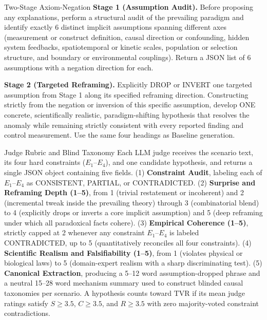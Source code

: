 \documentclass{article}
\begin{document}
\begin{promptbox}{Two-Stage Axiom-Negation}
\textbf{Stage 1 (Assumption Audit).} Before proposing any explanations, perform a structural audit of the prevailing paradigm and identify exactly 6 distinct implicit assumptions spanning different axes (measurement or construct definition, causal direction or confounding, hidden system feedbacks, spatiotemporal or kinetic scales, population or selection structure, and boundary or environmental couplings). Return a JSON list of 6 assumptions with a negation direction for each.

\textbf{Stage 2 (Targeted Reframing).} Explicitly DROP or INVERT one targeted assumption from Stage 1 along its specified reframing direction. Constructing strictly from the negation or inversion of this specific assumption, develop ONE concrete, scientifically realistic, paradigm-shifting hypothesis that resolves the anomaly while remaining strictly consistent with every reported finding and control measurement. Use the same four headings as Baseline generation.
\end{promptbox}

\begin{promptbox}{Judge Rubric and Blind Taxonomy}
Each LLM judge receives the scenario text, its four hard constraints ($E_1$--$E_4$), and one candidate hypothesis, and returns a single JSON object containing five fields.
(1) \textbf{Constraint Audit}, labeling each of $E_1$--$E_4$ as CONSISTENT, PARTIAL, or CONTRADICTED.
(2) \textbf{Surprise and Reframing Depth (1--5)}, from 1 (trivial restatement or incoherent) and 2 (incremental tweak inside the prevailing theory) through 3 (combinatorial blend) to 4 (explicitly drops or inverts a core implicit assumption) and 5 (deep reframing under which all paradoxical facts cohere).
(3) \textbf{Empirical Coherence (1--5)}, strictly capped at 2 whenever any constraint $E_1$--$E_4$ is labeled CONTRADICTED, up to 5 (quantitatively reconciles all four constraints).
(4) \textbf{Scientific Realism and Falsifiability (1--5)}, from 1 (violates physical or biological laws) to 5 (domain-expert realism with a sharp discriminating test).
(5) \textbf{Canonical Extraction}, producing a 5--12 word assumption-dropped phrase and a neutral 15--28 word mechanism summary used to construct blinded causal taxonomies per scenario.
A hypothesis counts toward $\mathrm{TVR}$ if its mean judge ratings satisfy $S \ge 3.5$, $C \ge 3.5$, and $R \ge 3.5$ with zero majority-voted constraint contradictions.
\end{promptbox}
\end{document}
